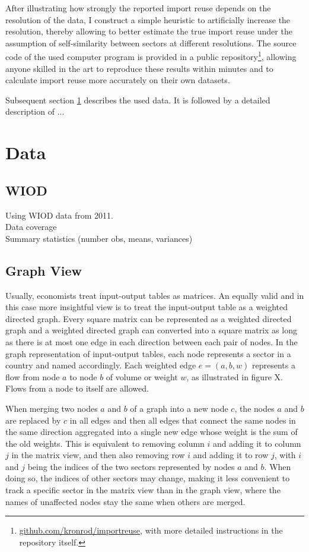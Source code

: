 \documentclass[english]{uzhpub}
\begin{document}
After illustrating how strongly the reported import reuse depends on the resolution of the data, I construct a simple heuristic to artificially increase the resolution, thereby allowing to better estimate the true import reuse under the assumption of self-similarity between sectors at different resolutions. The source code of the used computer program is provided in a public repository\footnote{\href{https://github.com/kronrod/importreuse}{github.com/kronrod/importreuse}, with more detailed instructions in the repository itself.}, allowing anyone skilled in the art to reproduce these results within minutes and to calculate import reuse more accurately on their own datasets.

Subsequent section \ref{sec:data} describes the used data. It is followed by a detailed description of ...


\section{Data}
\label{sec:data}
\subsection{WIOD}
Using WIOD data from 2011.\\
Data coverage\\
Summary statistics (number obs, means, variances)\\
\subsection{Graph View}
\label{sec:graphview}
Usually, economists treat input-output tables as matrices. An equally valid and in this case more insightful view is to treat the input-output table as a weighted directed graph. Every square matrix can be represented as a weighted directed graph and a weighted directed graph can converted into a square matrix as long as there is at most one edge in each direction between each pair of nodes. In the graph representation of input-output tables, each node represents a sector in a country and named accordingly. Each weighted edge $e=(a, b, w)$ represents a flow from node $a$ to node $b$ of volume or weight $w$, as illustrated in figure X. Flows from a node to itself are allowed.

When merging two nodes $a$ and $b$ of a graph into a new node $c$, the nodes $a$ and $b$ are replaced by $c$ in all edges and then all edges that connect the same nodes in the same direction aggregated into a single new edge whose weight is the sum of the old weights. This is equivalent to removing column $i$ and adding it to column $j$ in the matrix view, and then also removing row $i$ and adding it to row $j$, with $i$ and $j$ being the indices of the two sectors represented by nodes $a$ and $b$. When doing so, the indices of other sectors may change, making it less convenient to track a specific sector in the matrix view than in the graph view, where the names of unaffected nodes stay the same when others are merged.
\end{document}
